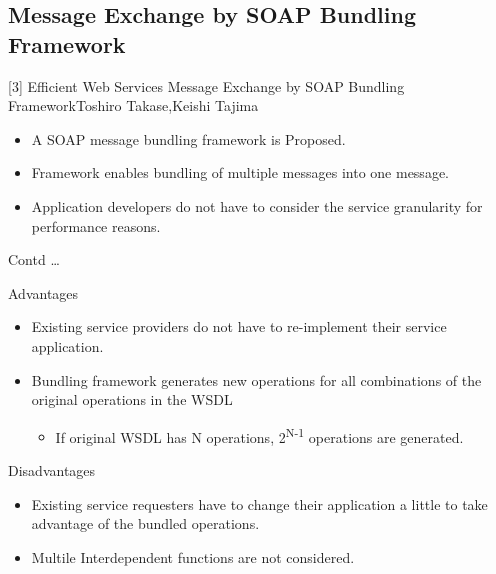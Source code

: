 \documentclass[10pt]{beamer}
\begin{document}
\subsection{Message Exchange by SOAP Bundling Framework}
\begin{frame}{[3] Efficient Web Services Message Exchange by SOAP Bundling Framework}{Toshiro Takase,Keishi Tajima}
	\begin{block}{}
\begin{itemize}
\item A SOAP message bundling framework is Proposed.
\item Framework enables bundling of multiple messages into one message.
\item Application developers do not have to consider the service granularity for performance reasons.
\end{itemize}
\end{block}
\end{frame}
\begin{frame}{Contd \dots}
\begin{block}{Advantages}
\begin{itemize}
\item Existing service providers do not have to
re-implement their service application.
\item Bundling framework generates new operations for all combinations of the original operations in the WSDL
\begin{itemize}

\item If original WSDL has N operations, 2\textsuperscript{N-1} operations
are generated.
\end{itemize}
\end{itemize}
\end{block}
\begin{block}{Disadvantages}
\begin{itemize}
\item Existing service requesters have to change their application a little to take advantage of the bundled operations.
\item Multile Interdependent functions are not considered.
\end{itemize}
\end{block}
\end{frame}
\end{document}
